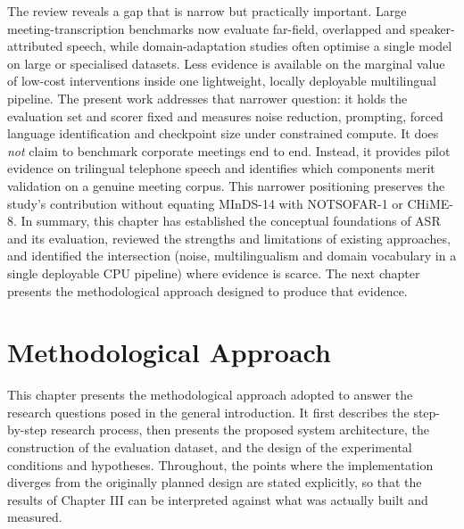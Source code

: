 \documentclass[12pt]{report}
\begin{document}
The review reveals a gap that is narrow but practically important. Large meeting-transcription benchmarks now evaluate far-field, overlapped and speaker-attributed speech, while domain-adaptation studies often optimise a single model on large or specialised datasets. Less evidence is available on the marginal value of low-cost interventions inside one lightweight, locally deployable multilingual pipeline. The present work addresses that narrower question: it holds the evaluation set and scorer fixed and measures noise reduction, prompting, forced language identification and checkpoint size under constrained compute. It does \emph{not} claim to benchmark corporate meetings end to end. Instead, it provides pilot evidence on trilingual telephone speech and identifies which components merit validation on a genuine meeting corpus. This narrower positioning preserves the study's contribution without equating MInDS-14 with NOTSOFAR-1 or CHiME-8.
\vspace{0.5em}
In summary, this chapter has established the conceptual foundations of ASR and its evaluation, reviewed the strengths and limitations of existing approaches, and identified the intersection (noise, multilingualism and domain vocabulary in a single deployable CPU pipeline) where evidence is scarce. The next chapter presents the methodological approach designed to produce that evidence.
\chapter{Methodological Approach}
This chapter presents the methodological approach adopted to answer the research questions posed in the general introduction. It first describes the step-by-step research process, then presents the proposed system architecture, the construction of the evaluation dataset, and the design of the experimental conditions and hypotheses. Throughout, the points where the implementation diverges from the originally planned design are stated explicitly, so that the results of Chapter III can be interpreted against what was actually built and measured.
\end{document}
